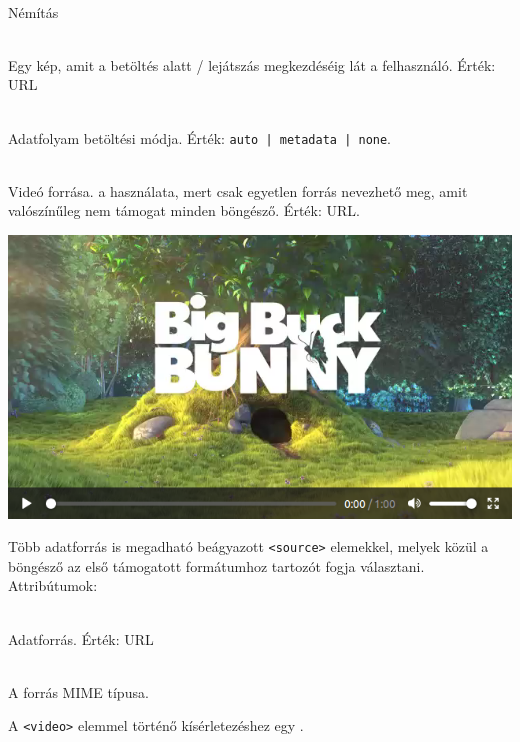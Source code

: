 \begin{frame}
  \begin{description}[m]
    \item[\texttt{<muted>}] \hfill \\ Némítás
    \item[\texttt{<poster>}] \hfill \\ Egy kép, amit a betöltés 
    alatt / lejátszás megkezdéséig lát a felhasználó. Érték: URL
    \item[\texttt{<preload>}] \hfill \\ Adatfolyam betöltési módja. 
    Érték: \texttt{auto | metadata | none}.
    \item[\texttt{<src>}] \hfill \\ Videó forrása.  a használata, mert csak egyetlen forrás nevezhető meg, 
    amit valószínűleg nem támogat minden böngésző. Érték: URL.
  \end{description}
\end{frame}

\begin{frame}
  \begin{exampleblock}{}
    \footnotesize
    
  \end{exampleblock}
    \begin{center}
    \includegraphics[scale=.2]{video1.png}
  \end{center}
\end{frame}

\begin{frame}
  Több adatforrás is megadható beágyazott \texttt{<source>} elemekkel, melyek 
  közül a böngésző az első támogatott formátumhoz tartozót 
  fogja választani. Attribútumok:
  \begin{description}[m]
    \item[\texttt{<src>}] \hfill \\ Adatforrás. Érték: URL
    \item[\texttt{<type>}] \hfill \\ A forrás MIME típusa.
  \end{description}
  A \texttt{<video>} elemmel történő kísérletezéshez egy 
  .
\end{frame}

